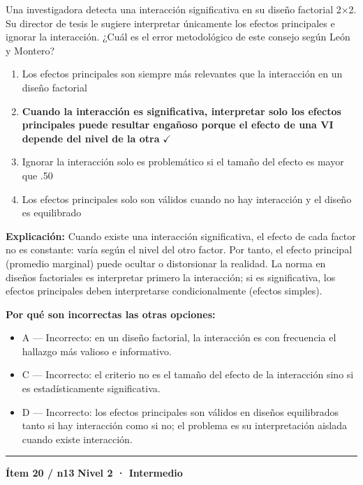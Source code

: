 \documentclass[12pt,a4paper]{article}
\begin{document}
Una investigadora detecta una interacción significativa en su diseño factorial 2×2. Su director de tesis le sugiere interpretar únicamente los efectos principales e ignorar la interacción. ¿Cuál es el error metodológico de este consejo según León y Montero?

\begin{enumerate}
  \item[A.] Los efectos principales son siempre más relevantes que la interacción en un diseño factorial
  \item[\textbf{\color{verde}B.}] \textbf{\color{verde} Cuando la interacción es significativa, interpretar solo los efectos principales puede resultar engañoso porque el efecto de una VI depende del nivel de la otra} \hfill $\checkmark$
  \item[C.] Ignorar la interacción solo es problemático si el tamaño del efecto es mayor que .50
  \item[D.] Los efectos principales solo son válidos cuando no hay interacción y el diseño es equilibrado
\end{enumerate}

\noindent\textbf{\color{azul}Explicación:} Cuando existe una interacción significativa, el efecto de cada factor no es constante: varía según el nivel del otro factor. Por tanto, el efecto principal (promedio marginal) puede ocultar o distorsionar la realidad. La norma en diseños factoriales es interpretar primero la interacción; si es significativa, los efectos principales deben interpretarse condicionalmente (efectos simples).

\noindent\textbf{\color{gris}Por qué son incorrectas las otras opciones:}
\begin{itemize}
  \item {\small A — Incorrecto: en un diseño factorial, la interacción es con frecuencia el hallazgo más valioso e informativo.}
  \item {\small C — Incorrecto: el criterio no es el tamaño del efecto de la interacción sino si es estadísticamente significativa.}
  \item {\small D — Incorrecto: los efectos principales son válidos en diseños equilibrados tanto si hay interacción como si no; el problema es su interpretación aislada cuando existe interacción.}
\end{itemize}
\vspace{8pt}\hrule\vspace{10pt}

\begin{mdframed}[backgroundcolor=fondogris,linecolor=ambar,linewidth=1pt,innerleftmargin=10pt,innerrightmargin=10pt,innertopmargin=7pt,innerbottommargin=7pt]
\textbf{Ítem 20 / n13} \hfill {\small\bfseries\color{ambar} Nivel 2 · Intermedio}
\end{mdframed}
\end{document}
